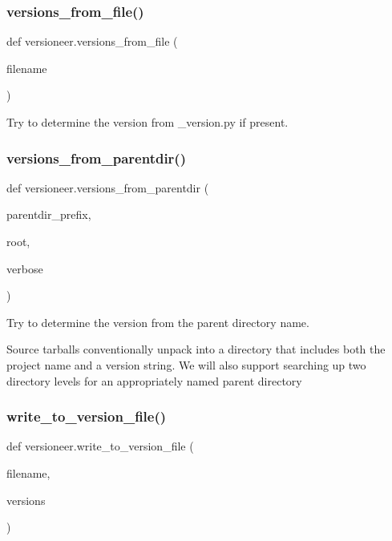 \subsubsection{\texorpdfstring{versions\+\_\+from\+\_\+file()}{versions\_from\_file()}}
{\footnotesize\ttfamily def versioneer.\+versions\+\_\+from\+\_\+file (\begin{DoxyParamCaption}\item[{}]{filename }\end{DoxyParamCaption})}

\begin{DoxyVerb}Try to determine the version from _version.py if present.\end{DoxyVerb}
 \mbox{\label{namespaceversioneer_a5ee38b3172cec8bf4720b1bbbf575f89}} 
\subsubsection{\texorpdfstring{versions\+\_\+from\+\_\+parentdir()}{versions\_from\_parentdir()}}
{\footnotesize\ttfamily def versioneer.\+versions\+\_\+from\+\_\+parentdir (\begin{DoxyParamCaption}\item[{}]{parentdir\+\_\+prefix,  }\item[{}]{root,  }\item[{}]{verbose }\end{DoxyParamCaption})}

\begin{DoxyVerb}Try to determine the version from the parent directory name.

Source tarballs conventionally unpack into a directory that includes both
the project name and a version string. We will also support searching up
two directory levels for an appropriately named parent directory
\end{DoxyVerb}
 \mbox{\label{namespaceversioneer_aac07ed00639b610d88bdfc030b3dcb86}} 
\subsubsection{\texorpdfstring{write\+\_\+to\+\_\+version\+\_\+file()}{write\_to\_version\_file()}}
{\footnotesize\ttfamily def versioneer.\+write\+\_\+to\+\_\+version\+\_\+file (\begin{DoxyParamCaption}\item[{}]{filename,  }\item[{}]{versions }\end{DoxyParamCaption})}

